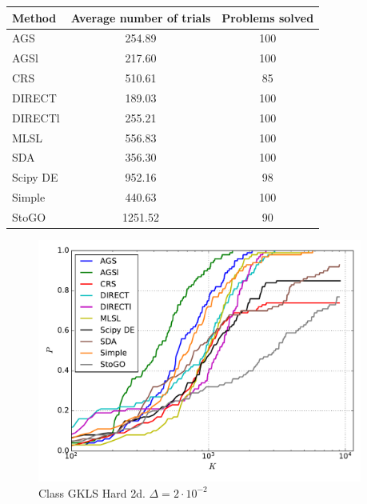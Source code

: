 \documentclass[a4paper]{article}
\begin{document}
\begin{tabular}{lcc}
\hline
 Method   &  Average number of trials  &  Problems solved  \\
\hline
 AGS      &           254.89           &        100        \\
 AGSl     &           217.60           &        100        \\
 CRS      &           510.61           &        85         \\
 DIRECT   &           189.03           &        100        \\
 DIRECTl  &           255.21           &        100        \\
 MLSL     &           556.83           &        100        \\
 SDA      &           356.30           &        100        \\
 Scipy DE &           952.16           &        98         \\
 Simple   &           440.63           &        100        \\
 StoGO    &          1251.52           &        90         \\
\hline
\end{tabular}
\begin{figure}[H]
  \center
  \includegraphics[width=0.95\textwidth]{../experiments/gklsh2d/cmc.pdf}
  \caption{Class GKLS Hard 2d. $\Delta=2\cdot10^{-2}$}
\end{figure}
\end{document}
